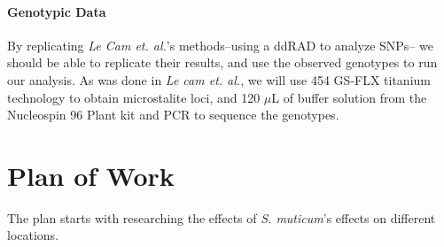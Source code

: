 \documentclass[12pt]{extarticle}
\begin{document}
\paragraph{Genotypic Data}
By replicating \textit{Le Cam et. al.}'s methods--using a ddRAD to analyze SNPs-- we should be able to replicate their results, and use the observed genotypes to run our analysis. As was done in \textit{Le cam et. al.}, we will use 454 GS‐FLX titanium technology to obtain microstalite loci, and 120 $\mu$L of buffer solution from the Nucleospin 96 Plant kit and PCR to sequence the genotypes.
\section{Plan of Work}
The plan starts with researching the effects of \textit{S. muticum}'s effects on different locations.



\FloatBarrier


\end{document}
